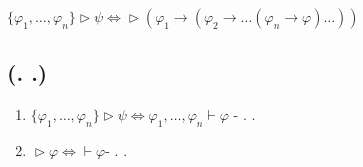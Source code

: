 $\{\varphi_{1},\dots,\varphi_{n}\}\vartriangleright\psi\Leftrightarrow\vartriangleright(\varphi_{1}\rightarrow(\varphi_{2}\rightarrow\dots(\varphi_{n}\rightarrow\varphi)\dots))$

\subsection{\textcyr{\CYRT\cyre\cyro\cyrr\cyre\cyrm\cyra} (\textcyr{\cyrb}. \textcyr{\cyrd}.)}
\begin{enumerate}
\item $\{\varphi_{1},\dots,\varphi_{n}\}\vartriangleright\psi\Leftrightarrow\varphi_{1},\dots,\varphi_{n}\vdash\varphi$
- \textcyr{\cyrd\cyro\cyrk\cyra\cyrz\cyru\cyre\cyrm\cyra} \textcyr{\cyrv}
\textcyr{\cyrs\cyre\cyrk\cyrv}. \textcyr{\cyri\cyrs\cyrch}. \textcyr{\cyrp\cyrr\cyre\cyrd\cyri\cyrk\cyra\cyrt\cyro\cyrv}
\item $\vartriangleright\varphi\Leftrightarrow\vdash\varphi$- \textcyr{\cyrd\cyro\cyrk\cyra\cyrz\cyru\cyre\cyrm\cyra}
\textcyr{\cyrv} \textcyr{\cyrs\cyre\cyrk\cyrv}. \textcyr{\cyri\cyrs\cyrch}.
\textcyr{\cyrp\cyrr\cyre\cyrd\cyri\cyrk\cyra\cyrt\cyro\cyrv}%

\end{enumerate}

